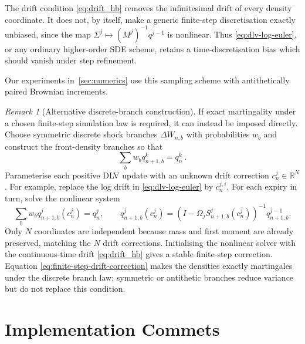 \documentclass[11pt]{article}
\theoremstyle{plain}
\theoremstyle{definition}
\theoremstyle{remark}
\newtheorem{remark}[theorem]{Remark}
\begin{document}
{  The drift condition \eqref{eq:drift_hb} removes the infinitesimal drift of
  every density coordinate. It does not, by itself, make a generic finite-step
  discretisation exactly unbiased, since the map
  $\Sigma^j\mapsto(M^j)^{-1}q^{j-1}$ is nonlinear. Thus
  \eqref{eq:dlv-log-euler}, or any ordinary higher-order SDE scheme, retains a
  time-discretisation bias which should vanish under step refinement.

  Our experiments in~\ref{sec:numerics} use this sampling scheme with antithetically paired Brownian increments.

\begin{remark}[Alternative discrete-branch construction]
  \label{rem:discrete-branch-sampling}
  If exact martingality under a chosen finite-step simulation law is required,
  it can instead be imposed directly. Choose symmetric discrete shock branches
  $\Delta W_{n,b}$ with probabilities $w_b$ and construct the front-density
  branches so that
  \[
    \sum_b w_bq_{n+1,b}^k=q_n^k \ .
  \]
  Parameterise each positive DLV update with an unknown drift correction
  $c_n^j\in\mathbb R^N$. For example, replace the log drift in
  \eqref{eq:dlv-log-euler} by $c_n^{j,i}$. For each expiry in turn, solve the
  nonlinear system
  \begin{equation}
    \label{eq:finite-step-drift-correction}
    \sum_b w_b q_{n+1,b}^j(c_n^j)=q_n^j,
    \qquad
    q_{n+1,b}^j(c_n^j)
      =\left(I-\Omega_jS_{n+1,b}^j(c_n^j)\right)^{-1}
        q_{n+1,b}^{j-1}.
  \end{equation}
  Only $N$ coordinates are independent because mass and first moment are
  already preserved, matching the $N$ drift corrections. Initialising the
  nonlinear solver with the continuous-time drift
  \eqref{eq:drift_hb} gives
  a stable finite-step correction. Equation
  \eqref{eq:finite-step-drift-correction} makes the densities exactly
  martingales under the discrete branch law; symmetric or antithetic branches
  reduce variance but do not replace this condition.

\end{remark}
  }

  


  \pagebreak








\section{Implementation Commets}
\end{document}
